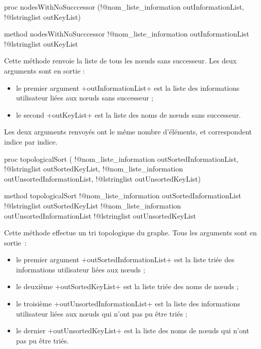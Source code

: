 \begin{galgas4}
proc nodesWithNoSucccessor (!@nom_liste_information outInformationList,
                          !@lstringlist outKeyList)
\end{galgas4}

\begin{galgas3}
method nodesWithNoSucccessor !@nom_liste_information outInformationList
                           !@lstringlist outKeyList
\end{galgas3}

Cette méthode renvoie la liste de tous les nœuds sans successeur. Les deux arguments sont en sortie :
\begin{itemize}
  \item le premier argument \ggst+outInformationList+ est la liste des informations utilisateur liées aux nœuds sans successeur ;
  \item le second \ggst+outKeyList+ est la liste des noms de nœuds sans successeur.
\end{itemize}

Les deux arguments renvoyés ont le même nombre d'éléments, et correspondent indice par indice.






\begin{galgas4}
proc topologicalSort (
  !@nom_liste_information outSortedInformationList,
  !@lstringlist outSortedKeyList,
  !@nom_liste_information outUnsortedInformationList,
  !@lstringlist outUnsortedKeyList)
\end{galgas4}

\begin{galgas3}
method topologicalSort
  !@nom_liste_information outSortedInformationList
  !@lstringlist outSortedKeyList
  !@nom_liste_information outUnsortedInformationList
  !@lstringlist outUnsortedKeyList
\end{galgas3}

Cette méthode effectue un tri topologique du graphe. Tous les arguments sont en sortie~:
\begin{itemize}
  \item le premier argument \ggst+outSortedInformationList+ est la liste triée des informations utilisateur liées aux nœuds ;
  \item le deuxième \ggst+outSortedKeyList+ est la liste triée des noms de nœuds ;
  \item le troisième \ggst+outUnsortedInformationList+ est la liste des informations utilisateur liées aux nœuds qui n'ont pas pu être triés ;
  \item le dernier \ggst+outUnsortedKeyList+ est la liste des noms de nœuds qui n'ont pas pu être triés.
\end{itemize}

